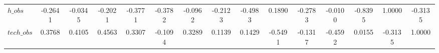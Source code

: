 \begin{center}
\begin{longtable}{lcccccccccccccc}
$h\_obs         $	 & 	          -0.2641	 & 	          -0.0345	 & 	          -0.2021	 & 	          -0.3771	 & 	          -0.3782	 & 	          -0.0962	 & 	          -0.2123	 & 	          -0.4983	 & 	           0.1890	 & 	          -0.2783	 & 	          -0.0100	 & 	          -0.8395	 & 	           1.0000	 & 	          -0.3135 \\ 
$tech\_obs      $	 & 	           0.3768	 & 	           0.4105	 & 	           0.4563	 & 	           0.3307	 & 	          -0.1094	 & 	           0.3289	 & 	           0.1139	 & 	           0.1429	 & 	          -0.5491	 & 	          -0.1317	 & 	          -0.4592	 & 	           0.0155	 & 	          -0.3135	 & 	           1.0000 \\ 
\end{longtable}
 \end{center}
